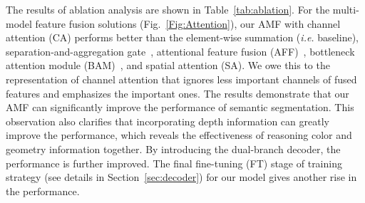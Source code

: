 \documentclass[10pt,twocolumn,letterpaper]{article}
\begin{document}
The results of ablation analysis are shown in Table~\ref{tab:ablation}. For the multi-model feature fusion solutions (Fig.~\ref{Fig:Attention}), our AMF with channel attention (CA) performs better than the element-wise summation (\textit{i.e.} baseline), separation-and-aggregation gate~\cite{Chen:ECCV20}, attentional feature fusion (AFF)~\cite{Dai:WACV21}, bottleneck attention module (BAM)~\cite{Park:BMVC18}, and spatial attention (SA). We owe this to the representation of channel attention that ignores less important channels of fused features and emphasizes the important ones. The results demonstrate that our AMF can significantly improve the performance of semantic segmentation. This observation also clarifies that incorporating depth information can greatly improve the performance, which reveals the effectiveness of reasoning color and geometry information together. By introducing the dual-branch decoder, the performance is further improved. The final fine-tuning (FT) stage of training strategy (see details in Section~\ref{sec:decoder}) for our model gives another rise in the performance.
\end{document}
